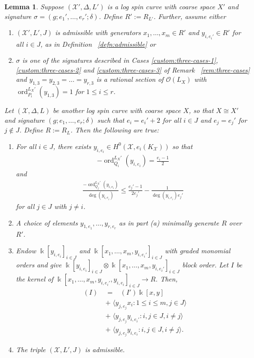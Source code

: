 \documentclass{amsart}
\theoremstyle{plain}
\newtheorem{lem}[thm]{Lemma}
\theoremstyle{definition}
\theoremstyle{remark}
\numberwithin{equation}{section}
\newcommand\Bk{{\Bbbk}}
\newcommand\sco{{\mathscr O}}
\DeclareMathOperator{\ord}{ord}
\newcommand\sx{\mathscr X}
\newcommand \subhalf[1]{\frac{{#1} - 1}{2{#1}}}
\newcommand{\halfcan}{L}
\DeclareMathOperator{\initial}{in_\prec}
\begin{document}
\begin{lem}
\label{lem:raise-stacky-order}
Suppose $(\sx', \Delta, \halfcan')$ is a log spin curve with coarse
space $X'$ and signature $\sigma = (g; e_1', \ldots, e_r'; \delta)$.  Define $R':= R_{\halfcan'}$.  Further, assume either 
\begin{enumerate}
	\item $(\sx', \halfcan', J)$ is admissible with generators $x_1,
		\ldots, x_m \in R'$ and $y_{i, e_i'} \in R' $ for all $i \in J$, as 
		in Definition ~\ref{defn:admissible} or
	\item $\sigma$ is one of the signatures described in Cases
		\ref{custom:three-cases-1}, \ref{custom:three-cases-2} and
		\ref{custom:three-cases-3} of Remark ~\ref{rem:three-cases} and
		$y_{1, 3} = y_{2,3} = \ldots= y_{r,3}$ is a rational section of
		$\sco(\halfcan_X)$ with $\ord_{P_i}^{\halfcan_X'}(y_{1,3}) = 1$
		for $1 \leq  i \leq r$.
\end{enumerate}
Let
$(\sx, \Delta, \halfcan)$ be another log spin curve
with coarse space $X$, so that $X \cong X'$ and signature $(g; e_1, \ldots, e_r;
\delta)$ such that $e_i = e_i' + 2$ for all $i \in J$ and
$e_j = e_j'$ for $j \notin J$. Define $R := R_\halfcan$.  Then the following are true:
\begin{enumerate}
	\item[(a)] For all $i \in J$, there exists $y_{i, e_i} \in
		H^0(\sx, e_i(K_\sx))$ so that
		\begin{align*}
			-\ord_{Q_i}
^{\halfcan_X'}(y_{i, e_i}) = \frac{e_i - 1}{2}
		\end{align*}
		and
		\begin{align*}
			\frac{-\ord_{Q_j}
^{\halfcan_X'}(y_{i, e_i})}{\deg (y_{i, e_i})} \leq 
\subhalf{
			e_j'} - \frac{1}{\deg(y_{i, e_i})e_j'}
		\end{align*}
		for all $j \in J$ with $j \neq i$.
	\item[(b)] 
	
		A choice of elements $y_{1, e_1}, \ldots, y_{r, e_r}$ as in part (a) minimally
		generate $R$ over $R'$.
	\item[(c)] Endow $\Bk[y_{i, e_i}]_{i\in J}$ and $ \Bk[x_1, \ldots, x_m, y_{i, e_i'}]_{i\in J}$ with graded monomial orders and give 
$\Bk[y_{i, e_i}]_{i\in J} \otimes \Bk[x_1, \ldots, x_m, y_{i, e_i'}]_{i\in J}$
 block order.  Let $I$ be the kernel of $\Bk[x_1, \ldots, x_m, y_{i, e_i'}, y_{i, e_i}]_{i\in J} \to R$.
  Then,
		\begin{align*}
			\initial(I) \;	&= \; \initial(I')\Bk[x, y] \\
					&+ \; \langle y_{j, e_j}x_i  : 1\le i \le m, j\in J\rangle \\
					&+ \; \langle y_{j, e_j}y_{i, e_i'}: i,j\in J, i\ne j\rangle \\
					&+ \; \langle y_{j,e_j}y_{i,e_i}: i,j\in J, i\ne j\rangle.
		\end{align*}
	\item[(d)] The triple $(\sx, \halfcan', J)$ is admissible.
\end{enumerate}
\end{lem}
\end{document}
